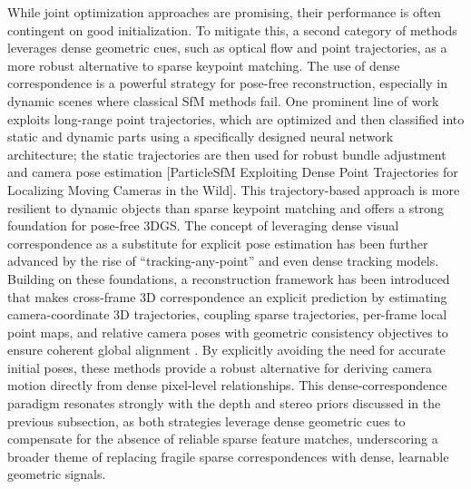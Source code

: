 \documentclass[11pt]{article}
\begin{document}
While joint optimization approaches are promising, their performance is often contingent on good initialization. To mitigate this, a second category of methods leverages dense geometric cues, such as optical flow and point trajectories, as a more robust alternative to sparse keypoint matching. The use of dense correspondence is a powerful strategy for pose-free reconstruction, especially in dynamic scenes where classical SfM methods fail. One prominent line of work exploits long-range point trajectories, which are optimized and then classified into static and dynamic parts using a specifically designed neural network architecture; the static trajectories are then used for robust bundle adjustment and camera pose estimation {[}ParticleSfM Exploiting Dense Point Trajectories for Localizing Moving
Cameras in the Wild{]}. This trajectory-based approach is more resilient to dynamic objects than sparse keypoint matching and offers a strong foundation for pose-free 3DGS. The concept of leveraging dense visual correspondence as a substitute for explicit pose estimation has been further advanced by the rise of ``tracking-any-point'' and even dense tracking models. Building on these foundations, a reconstruction framework has been introduced that makes cross-frame 3D correspondence an explicit prediction by estimating camera-coordinate 3D trajectories, coupling sparse trajectories, per-frame local point maps, and relative camera poses with geometric consistency objectives to ensure coherent global alignment \cite{ref273}. By explicitly avoiding the need for accurate initial poses, these methods provide a robust alternative for deriving camera motion directly from dense pixel-level relationships. This dense-correspondence paradigm resonates strongly with the depth and stereo priors discussed in the previous subsection, as both strategies leverage dense geometric cues to compensate for the absence of reliable sparse feature matches, underscoring a broader theme of replacing fragile sparse correspondences with dense, learnable geometric signals.
\end{document}
